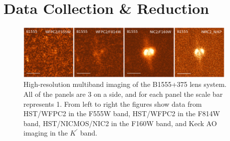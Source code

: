 \documentclass[useAMS,usenatbib]{mn2e}
\begin{document}

\section{Data Collection \& Reduction}

\begin{figure}
\includegraphics[width=0.95\textwidth]{B1555_gallery.eps}
\caption{High-resolution multiband imaging of the B1555+375 lens system.
All of the panels are 3 on a side, and for each panel the scale bar 
represents 1\arcsec.  From left to right the figures show data from
HST/WFPC2 in the F555W band, HST/WFPC2 in the F814W band, HST/NICMOS/NIC2
in the F160W band, and Keck AO imaging in the $K^\prime$ band.
\label{fig:multiband}}
%

\end{figure}
\end{document}
